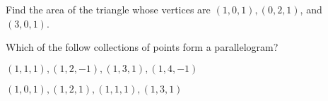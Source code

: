 \documentclass[paper=letter, 11pt]{article}
\begin{document}
\Prob Find the area of the triangle whose vertices are $(1,0,1), (0, 2, 1)$, and $(3, 0, 1)$.\vfill

\Prob Which of the follow collections of points form a parallelogram?

\begin{multicols}{2}
   \subprob $(1, 1, 1), (1, 2, -1), (1, 3, 1), (1, 4, -1)$

   \columbreak

   \subprob $(1, 0, 1), (1, 2, 1), (1, 1, 1), (1, 3, 1)$
\end{multicols}
\vfill
\end{document}
